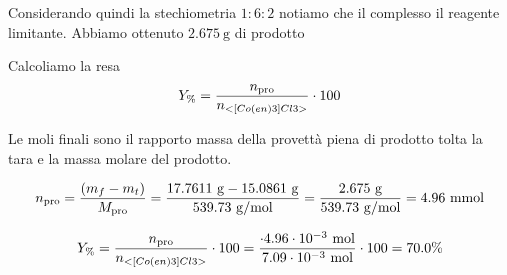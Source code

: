 Considerando quindi la stechiometria $1: 6: 2$ notiamo che il complesso il reagente limitante. Abbiamo ottenuto $ 2.675 \mathrm{~g}$ di prodotto



Calcoliamo la resa 
\[ Y_\% = \frac{n_\text{pro}}{n_{<[Co(en)3]Cl3>}}\cdot 100 \]

Le moli finali sono il rapporto massa della provettà piena di prodotto tolta la tara e la massa molare del prodotto.

\[ n_\text{pro} = \frac{(m_{f} - m_{t})}{M_\text{pro}} 
 = \frac{ 17.7611 \mathrm{\ g} - 15.0861 \mathrm{\ g} }{ 539.73 \mathrm{\ g/mol}} =  \frac{2.675 \mathrm{~g}}{539.73 \mathrm{~g} / \mathrm{mol}}=4.96 \mathrm{\ mmol}\]

\[ Y_\% = \frac{n_\text{pro}}{n_{<[Co(en)3]Cl3>}}\cdot 100  = \frac{ \cdot 4.96 \cdot 10^{-3} \mathrm{~mol}}{7.09 \cdot 10^{-3} \mathrm{~mol}} \cdot 100 =70.0\%\]

